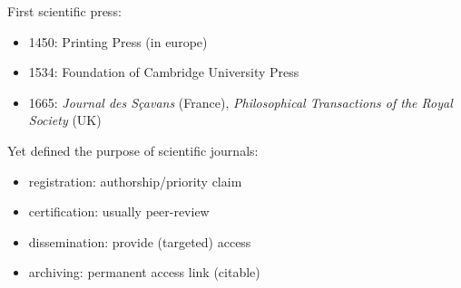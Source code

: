 \documentclass[10pt,compress,serif]{beamer}
\begin{document}
\begin{frame}[t]%
 \vskip1cm%

{\large First scientific press:\newline}
 
 \begin{itemize}


 \item 1450: Printing Press (in europe)
 \item 1534: Foundation of Cambridge University Press
 \item 1665: \textit{Journal des Sçavans} (France), \textit{Philosophical Transactions of the Royal Society} (UK)\\
 \end{itemize}

 \vfill
{\large Yet defined the purpose of scientific journals:\newline}

\begin{itemize}
\item registration: authorship/priority claim
\item certification: usually peer-review
\item dissemination: provide (targeted) access
\item archiving: permanent access link (citable) 
\end{itemize}
\end{frame}
\end{document}
